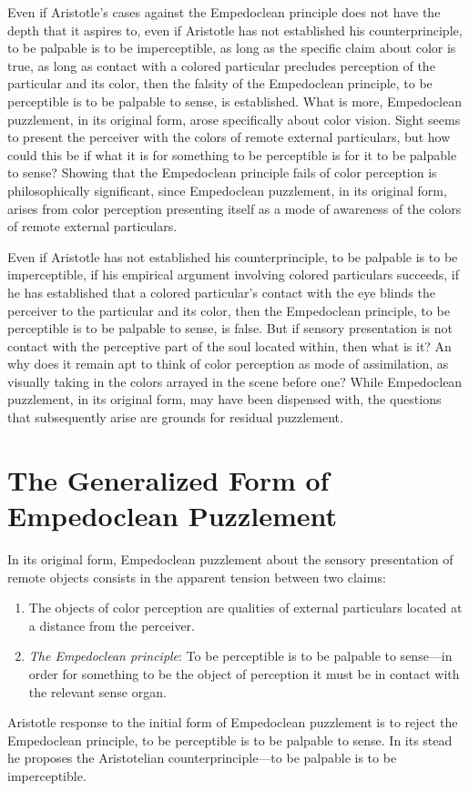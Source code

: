 Even if Aristotle's cases against the Empedoclean principle does not have the depth that it aspires to, even if Aristotle has not established his counterprinciple, to be palpable is to be imperceptible, as long as the specific claim about color is true, as long as contact with a colored particular precludes perception of the particular and its color, then the falsity of the Empedoclean principle, to be perceptible is to be palpable to sense, is established. What is more, Empedoclean puzzlement, in its original form, arose specifically about color vision. Sight seems to present the perceiver with the colors of remote external particulars, but how could this be if what it is for something to be perceptible is for it to be palpable to sense? Showing that the Empedoclean principle fails of color perception is philosophically significant, since Empedoclean puzzlement, in its original form, arises from color perception presenting itself as a mode of awareness of the colors of remote external particulars. 

Even if Aristotle has not established his counterprinciple, to be palpable is to be imperceptible, if his empirical argument involving colored particulars succeeds, if he has established that a colored particular's contact with the eye blinds the perceiver to the particular and its color, then the Empedoclean principle, to be perceptible is to be palpable to sense, is false. But if sensory presentation is not contact with the perceptive part of the soul located within, then what is it? An why does it remain apt to think of color perception as mode of assimilation, as visually taking in the colors arrayed in the scene before one? While Empedoclean puzzlement, in its original form, may have been dispensed with, the questions that subsequently arise are grounds for residual puzzlement.


\section{The Generalized Form of Empedoclean Puzzlement} %
\label{sec:the_generalized_form_of_empedoclean_puzzlement}

In its original form, Empedoclean puzzlement about the sensory presentation of remote objects consists in the apparent tension between two claims:
\begin{enumerate}[(1)]
    \item The objects of color perception are qualities of external particulars located at a distance from the perceiver.
    \item \emph{The Empedoclean principle}: To be perceptible is to be palpable to sense---in order for something to be the object of perception it must be in contact with the relevant sense organ.
\end{enumerate}
Aristotle response to the initial form of Empedoclean puzzlement is to reject the Empedoclean principle, to be perceptible is to be palpable to sense. In its stead he proposes the Aristotelian counterprinciple---to be palpable is to be imperceptible. 

